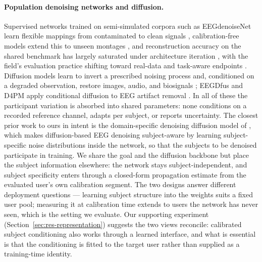 \paragraph{Population denoising networks and diffusion.}
Supervised networks trained on semi-simulated corpora such as EEGdenoiseNet learn flexible mappings from contaminated to clean signals \cite{zhang2021eegdenoisenet,sun2020rescnn,yu2022deepseparator,chuang2022icunet,lai2024cleegn}, calibration-free models extend this to unseen montages \cite{marcosmartinez2025eegoarnet}, and reconstruction accuracy on the shared benchmark has largely saturated under architecture iteration \cite{bindra2026capacity}, with the field's evaluation practice shifting toward real-data and task-aware endpoints \cite{xiang2025task}. Diffusion models learn to invert a prescribed noising process \cite{ho2020ddpm,song2021scoresde} and, conditioned on a degraded observation, restore images, audio, and biosignals \cite{saharia2022palette,richter2023storm,li2023descod}; EEGDfus and D4PM apply conditional diffusion to EEG artifact removal \cite{huang2025eegdfus,shao2025d4pm}. In all of these the participant variation is absorbed into shared parameters: none conditions on a recorded reference channel, adapts per subject, or reports uncertainty. The closest prior work to ours in intent is the domain-specific denoising diffusion model of \citet{duan2023dsddpm}, which makes diffusion-based EEG denoising subject-aware by learning subject-specific noise distributions inside the network, so that the subjects to be denoised participate in training. We share the goal and the diffusion backbone but place the subject information elsewhere: the network stays subject-independent, and subject specificity enters through a closed-form propagation estimate from the evaluated user's own calibration segment. The two designs answer different deployment questions --- learning subject structure into the weights suits a fixed user pool; measuring it at calibration time extends to users the network has never seen, which is the setting we evaluate. Our supporting experiment (Section~\ref{sec:res-representation}) suggests the two views reconcile: calibrated subject conditioning also works through a learned interface, and what is essential is that the conditioning is fitted to the target user rather than supplied as a training-time identity.

